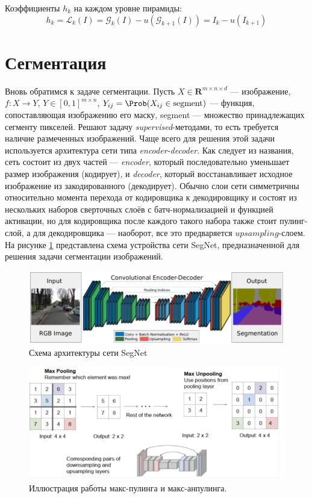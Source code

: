 \documentclass{article}
\theoremstyle{definition}
\theoremstyle{theorem}
\theoremstyle{remark}
\theoremstyle{theorem}
\theoremstyle{example}
\theoremstyle{theorem}
\theoremstyle{theorem}
\theoremstyle{theorem}
\theoremstyle{theorem}
\begin{document}
Коэффициенты $h_k$ на каждом уровне пирамиды: $$h_k = \mathcal{L}_k(I) = \mathcal{G}_k(I) - u(\mathcal{G}_{k+1}(I)) = I_k - u\left(I_{k+1}\right)$$

\section{Сегментация}
Вновь обратимся к задаче сегментации. 
Пусть $X \in \mathbf{R}^{m \times n \times d} $ --- изображение, $f:X\to Y$, $Y\in[0,1]^{m\times n}$, $Y_{ij}=\Prob(X_{ij}\in\text{segment})$ --- функция, сопоставляющая изображению его маску, segment --- множество принадлежащих сегменту пикселей. Решают задачу \textit{supervised}-методами, то есть требуется наличие размеченных изображений.
Чаще всего для решения этой задачи используется архитектура сети типа \textit{encoder-decoder}.
Как следует из названия, сеть состоит из двух частей --- \textit{encoder}, который последовательно уменьшает размер изображения (кодирует), и \textit{decoder}, который восстанавливает исходное изображение из закодированного (декодирует).
Обычно слои сети симметричны относительно момента перехода от кодировщика к декодировщику и состоят из нескольких наборов сверточных слоёв с батч-нормализацией и функцией активации, но для кодировщика после каждого такого набора также стоит пулинг-слой, а для декодировщика --- наоборот, все это предваряется $\textit{upsampling}$-слоем. На рисунке \ref{ris:image} представлена схема устройства сети SegNet, предназначенной для решения задачи сегментации изображений.

\begin{figure}[h]
\begin{center}
	\includegraphics[width=1\textwidth]{img/segnet.png}
\end{center}
\caption{Схема архитектуры сети SegNet}
\label{ris:image}
\end{figure}

\begin{figure}[h]
\begin{center}
	\includegraphics[width=1\textwidth]{img/unpooling.png}
\end{center}
\caption{Иллюстрация работы макс-пулинга и макс-анпулинга.}
\label{ris:image1}
\end{figure}
\end{document}
